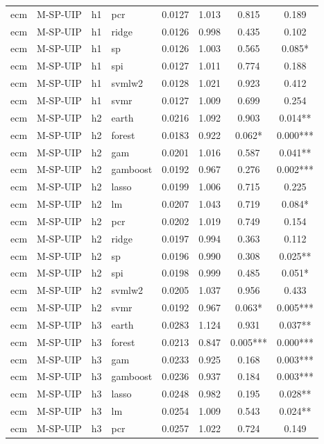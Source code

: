 \begin{ThreePartTable}
\begin{longtable}[t]{llclcccc}
ecm & M-SP-UIP & h1 & pcr & 0.0127 & 1.013 & 0.815 & 0.189\\
ecm & M-SP-UIP & h1 & ridge & 0.0126 & 0.998 & 0.435 & 0.102\\
ecm & M-SP-UIP & h1 & sp & 0.0126 & 1.003 & 0.565 & 0.085*\\
ecm & M-SP-UIP & h1 & spi & 0.0127 & 1.011 & 0.774 & 0.188\\
ecm & M-SP-UIP & h1 & svmlw2 & 0.0128 & 1.021 & 0.923 & 0.412\\
ecm & M-SP-UIP & h1 & svmr & 0.0127 & 1.009 & 0.699 & 0.254\\
\addlinespace
ecm & M-SP-UIP & h2 & earth & 0.0216 & 1.092 & 0.903 & 0.014**\\
ecm & M-SP-UIP & h2 & forest & 0.0183 & 0.922 & 0.062* & 0.000***\\
ecm & M-SP-UIP & h2 & gam & 0.0201 & 1.016 & 0.587 & 0.041**\\
ecm & M-SP-UIP & h2 & gamboost & 0.0192 & 0.967 & 0.276 & 0.002***\\
ecm & M-SP-UIP & h2 & lasso & 0.0199 & 1.006 & 0.715 & 0.225\\
ecm & M-SP-UIP & h2 & lm & 0.0207 & 1.043 & 0.719 & 0.084*\\
ecm & M-SP-UIP & h2 & pcr & 0.0202 & 1.019 & 0.749 & 0.154\\
ecm & M-SP-UIP & h2 & ridge & 0.0197 & 0.994 & 0.363 & 0.112\\
ecm & M-SP-UIP & h2 & sp & 0.0196 & 0.990 & 0.308 & 0.025**\\
ecm & M-SP-UIP & h2 & spi & 0.0198 & 0.999 & 0.485 & 0.051*\\
ecm & M-SP-UIP & h2 & svmlw2 & 0.0205 & 1.037 & 0.956 & 0.433\\
ecm & M-SP-UIP & h2 & svmr & 0.0192 & 0.967 & 0.063* & 0.005***\\
\addlinespace
ecm & M-SP-UIP & h3 & earth & 0.0283 & 1.124 & 0.931 & 0.037**\\
ecm & M-SP-UIP & h3 & forest & 0.0213 & 0.847 & 0.005*** & 0.000***\\
ecm & M-SP-UIP & h3 & gam & 0.0233 & 0.925 & 0.168 & 0.003***\\
ecm & M-SP-UIP & h3 & gamboost & 0.0236 & 0.937 & 0.184 & 0.003***\\
ecm & M-SP-UIP & h3 & lasso & 0.0248 & 0.982 & 0.195 & 0.028**\\
ecm & M-SP-UIP & h3 & lm & 0.0254 & 1.009 & 0.543 & 0.024**\\
ecm & M-SP-UIP & h3 & pcr & 0.0257 & 1.022 & 0.724 & 0.149\\

\end{longtable}
\end{ThreePartTable}
